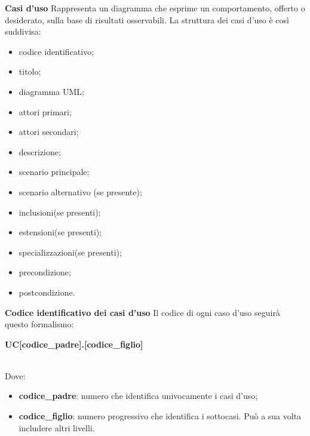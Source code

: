 \noindent
\textbf{Casi d'uso} \newline \newline
Rappresenta un diagramma che esprime un comportamento,
offerto o desiderato, sulla base di risultati osservabili.
La struttura dei casi d'uso è così suddivisa:
	\begin{itemize}
		\item codice identificativo;
		\item titolo;
		\item diagramma UML\glo;
		\item attori primari;
		\item attori secondari;
		\item descrizione;
		\item scenario principale;
		\item scenario alternativo (se presente);
		\item inclusioni(se presenti);
		\item estensioni(se presenti);
		\item specializzazioni(se presenti);
		\item precondizione;
		\item postcondizione. \\
	\end{itemize}

\noindent
\textbf{Codice identificativo dei casi d'uso} \newline \newline
Il codice di ogni caso d'uso seguirà questo formalismo: \newline \newline
\centerline{\textbf{UC[codice\_padre].[codice\_figlio]}} \\
Dove:
	\begin{itemize}
		\item \textbf{codice\_padre}: numero che identifica univocamente i casi 
			d'uso;
		\item \textbf{codice\_figlio}: numero progressivo che identifica i 
			sottocasi. Può a sua volta includere altri livelli. \\
	\end{itemize}

